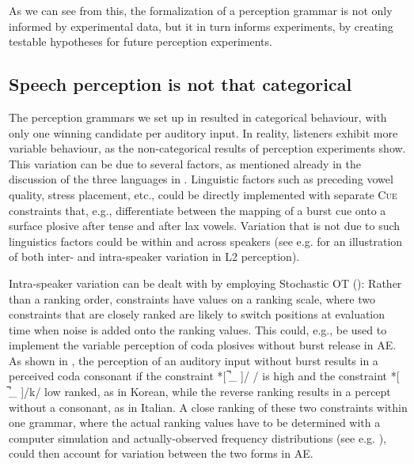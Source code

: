 \documentclass[output=paper,colorlinks,citecolor=brown]{langscibook}
\begin{document}
As we can see from this, the formalization of a perception grammar is not only informed by experimental data, but it in turn informs experiments, by creating testable hypotheses for future perception experiments. 

\subsection{Speech perception is not that categorical}\label{hamann:sec4_2}
\begin{sloppypar}
The perception grammars we set up in  resulted in categorical behaviour, with only one winning candidate per auditory input. In reality, listeners exhibit more variable behaviour, as the non-categorical results of perception experiments show. This variation can be due to several factors, as mentioned already in the discussion of the three languages in . Linguistic factors such as preceding vowel quality, stress placement, etc., could be directly implemented with separate C\textsc{ue} constraints that, e.g., differentiate between the mapping of a burst cue onto a surface plosive after tense and after lax vowels.
Variation that is not due to such linguistics factors could be within and across speakers (see e.g. \cite{ZhouHamann2020} for an illustration of both inter- and intra-speaker variation in L2 perception). 
\end{sloppypar}

\begin{sloppypar}
Intra-speaker variation can be dealt with by employing Stochastic OT (\cite{BoersmaHayes2001}): Rather than a ranking order, constraints have values on a ranking scale, where two constraints that are closely ranked are likely to switch positions at evaluation time when noise is added onto the ranking values. This could, e.g., be used to implement the variable perception of coda plosives without burst release in AE. As shown in , the perception of an auditory input without burst results in a perceived coda consonant if the constraint *[ ̚\_ ]/ / is high and the constraint *[ ̚\_ ]/k/ low ranked, as in Korean, while the reverse ranking results in a percept without a consonant, as in Italian. A close ranking of these two constraints within one grammar, where the actual ranking values have to be determined with a computer simulation and actually-observed frequency distributions (see e.g. \cite{BoersmaHayes2001}), could then account for variation between the two forms in AE.
\end{sloppypar}
\end{document}
